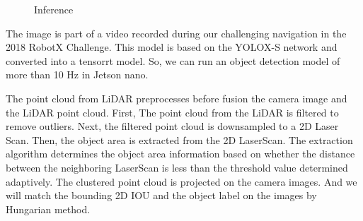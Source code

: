 \documentclass[lettersize,journal]{IEEEtran}
\begin{document}
\begin{figure}[H]
    \begin{center}
  \end{center}
  \caption{Inference}
  \label{fig:inference}
\end{figure}

The image is part of a video recorded during our challenging navigation in the 2018 RobotX Challenge.\cite{RobotX2018_video}
This model is based on the YOLOX-S network and converted into a tensorrt model.
So, we can run an object detection model of more than 10 Hz in Jetson nano.

\indent The point cloud from LiDAR preprocesses before fusion the camera image and the LiDAR point cloud.
First, The point cloud from the LiDAR is filtered to remove outliers.
Next, the filtered point cloud is downsampled to a 2D Laser Scan.
Then, the object area is extracted from the 2D LaserScan. \cite{scan_segmentation}
The extraction algorithm determines the object area information based on whether the distance between 
the neighboring LaserScan is less than the threshold value determined adaptively.
The clustered point cloud is projected on the camera images.
And we will match the bounding 2D IOU and the object label on the images by Hungarian method.\cite{hungarian}
\end{document}
